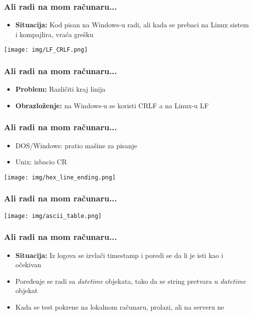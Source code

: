 \documentclass{beamer}
\begin{document}
\begin{frame}
\frametitle{Ali radi na mom računaru...}
\begin{itemize}
    \item \textbf{Situacija:} Kod pisan na Windows-u radi, ali kada se prebaci na Linux sistem i kompajlira, vraća grešku \newline
\end{itemize}
    \begin{center}
        \texttt{[image: img/LF\_CRLF.png]}
    \end{center}
\end{frame}

\begin{frame}
    \frametitle{Ali radi na mom računaru...}
    \begin{itemize}
        \item \textbf{Problem:} Različiti kraj linija \newline
        \item \textbf{Obrazloženje:} na Windows-u se koristi CRLF a na Linux-u LF
    \end{itemize}
    

\end{frame}

\begin{frame}
    \frametitle{Ali radi na mom računaru...}
    \begin{itemize}
        \item DOS/Windows: pratio mašine za pisanje \newline
        \item Unix: izbacio CR        \newline
    \end{itemize}
    \begin{center}
        \texttt{[image: img/hex\_line\_ending.png]}
    \end{center}
    \end{frame}

\begin{frame}
    \frametitle{Ali radi na mom računaru...}    
    \begin{center}
        \texttt{[image: img/ascii\_table.png]}
    \end{center}
\end{frame}

\begin{frame}
    \frametitle{Ali radi na mom računaru...}
    \begin{itemize}
        \item \textbf{Situacija:} Iz logova se izvlači timestamp i poredi se da li je isti kao i očekivan \newline
        \item Poređenje se radi sa \textit{datetime} objekata, tako da se string pretvara u \textit{datetime} objekat \newline
        \item Kada se test pokrene na lokalnom računaru, prolazi, ali na serveru ne
    \end{itemize}
\end{frame}
\end{document}

